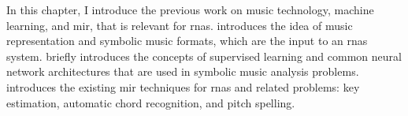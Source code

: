 

In this chapter, I introduce the previous work on music
technology, machine learning, and \gls{mir}, that is
relevant for \glspl{rna}. 
introduces the idea of music representation and symbolic
music formats, which are the input to an \glspl{rna} system.
 briefly introduces the concepts
of supervised learning and common neural network
architectures that are used in symbolic music analysis
problems.  introduces the
existing \gls{mir} techniques for \glspl{rna} and related
problems: key estimation, automatic chord recognition, and
pitch spelling.
